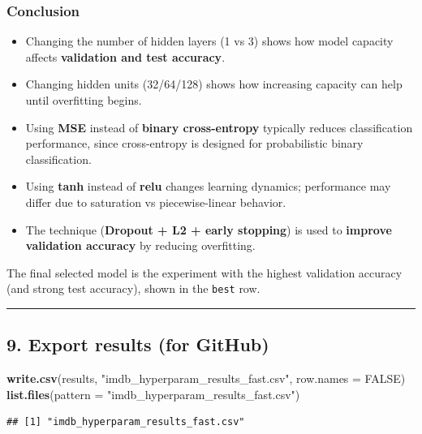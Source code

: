 \documentclass[
]{article}
\newenvironment{Shaded}{\begin{snugshade}}{\end{snugshade}}
\newcommand{\AttributeTok}[1]{\textcolor[rgb]{0.13,0.29,0.53}{#1}}
\newcommand{\ConstantTok}[1]{\textcolor[rgb]{0.56,0.35,0.01}{#1}}
\newcommand{\FunctionTok}[1]{\textcolor[rgb]{0.13,0.29,0.53}{\textbf{#1}}}
\newcommand{\NormalTok}[1]{#1}
\newcommand{\StringTok}[1]{\textcolor[rgb]{0.31,0.60,0.02}{#1}}
\providecommand{\tightlist}{%
  \setlength{\itemsep}{0pt}\setlength{\parskip}{0pt}}
\begin{document}
\subsubsection{Conclusion}\label{conclusion}

\begin{itemize}
\tightlist
\item
  Changing the number of hidden layers (1 vs 3) shows how model capacity
  affects \textbf{validation and test accuracy}.
\item
  Changing hidden units (32/64/128) shows how increasing capacity can
  help until overfitting begins.
\item
  Using \textbf{MSE} instead of \textbf{binary cross-entropy} typically
  reduces classification performance, since cross-entropy is designed
  for probabilistic binary classification.
\item
  Using \textbf{tanh} instead of \textbf{relu} changes learning
  dynamics; performance may differ due to saturation vs piecewise-linear
  behavior.
\item
  The technique (\textbf{Dropout + L2 + early stopping}) is used to
  \textbf{improve validation accuracy} by reducing overfitting.
\end{itemize}

The final selected model is the experiment with the highest validation
accuracy (and strong test accuracy), shown in the \texttt{best} row.

\begin{center}\rule{0.5\linewidth}{0.5pt}\end{center}

\subsection{9. Export results (for
GitHub)}\label{export-results-for-github}

\begin{Shaded}
\begin{Highlighting}[]
\FunctionTok{write.csv}\NormalTok{(results, }\StringTok{"imdb\_hyperparam\_results\_fast.csv"}\NormalTok{, }\AttributeTok{row.names =} \ConstantTok{FALSE}\NormalTok{)}
\FunctionTok{list.files}\NormalTok{(}\AttributeTok{pattern =} \StringTok{"imdb\_hyperparam\_results\_fast.csv"}\NormalTok{)}
\end{Highlighting}
\end{Shaded}

\begin{verbatim}
## [1] "imdb_hyperparam_results_fast.csv"
\end{verbatim}
\end{document}
